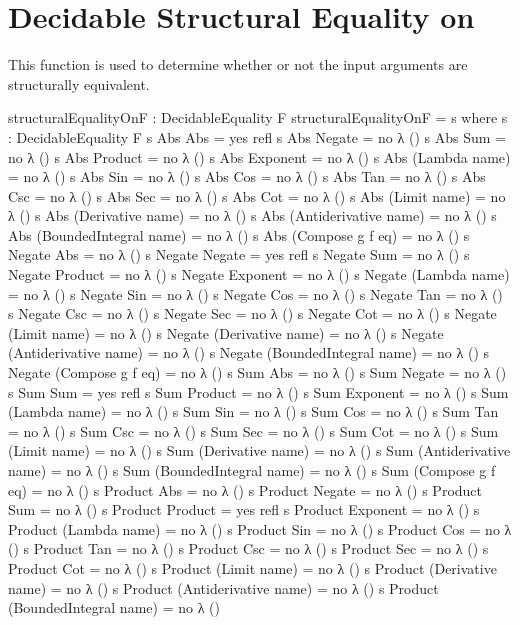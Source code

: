 \documentclass{report}
\begin{document}
\section{Decidable Structural Equality on }
This function is used to determine whether or not the input arguments are structurally equivalent.

\begin{code}
  structuralEqualityOnF : DecidableEquality F
  structuralEqualityOnF = s
    where
    s : DecidableEquality F
    s Abs Abs = yes refl
    s Abs Negate = no λ ()
    s Abs Sum = no λ ()
    s Abs Product = no λ ()
    s Abs Exponent = no λ ()
    s Abs (Lambda name) = no λ ()
    s Abs Sin = no λ ()
    s Abs Cos = no λ ()
    s Abs Tan = no λ ()
    s Abs Csc = no λ ()
    s Abs Sec = no λ ()
    s Abs Cot = no λ ()
    s Abs (Limit name) = no λ ()
    s Abs (Derivative name) = no λ ()
    s Abs (Antiderivative name) = no λ ()
    s Abs (BoundedIntegral name) = no λ ()
    s Abs (Compose g f eq) = no λ ()
    s Negate Abs = no λ ()
    s Negate Negate = yes refl
    s Negate Sum = no λ ()
    s Negate Product = no λ ()
    s Negate Exponent = no λ ()
    s Negate (Lambda name) = no λ ()
    s Negate Sin = no λ ()
    s Negate Cos = no λ ()
    s Negate Tan = no λ ()
    s Negate Csc = no λ ()
    s Negate Sec = no λ ()
    s Negate Cot = no λ ()
    s Negate (Limit name) = no λ ()
    s Negate (Derivative name) = no λ ()
    s Negate (Antiderivative name) = no λ ()
    s Negate (BoundedIntegral name) = no λ ()
    s Negate (Compose g f eq) = no λ ()
    s Sum Abs = no λ ()
    s Sum Negate = no λ ()
    s Sum Sum = yes refl
    s Sum Product = no λ ()
    s Sum Exponent = no λ ()
    s Sum (Lambda name) = no λ ()
    s Sum Sin = no λ ()
    s Sum Cos = no λ ()
    s Sum Tan = no λ ()
    s Sum Csc = no λ ()
    s Sum Sec = no λ ()
    s Sum Cot = no λ ()
    s Sum (Limit name) = no λ ()
    s Sum (Derivative name) = no λ ()
    s Sum (Antiderivative name) = no λ ()
    s Sum (BoundedIntegral name) = no λ ()
    s Sum (Compose g f eq) = no λ ()
    s Product Abs = no λ ()
    s Product Negate = no λ ()
    s Product Sum = no λ ()
    s Product Product = yes refl
    s Product Exponent = no λ ()
    s Product (Lambda name) = no λ ()
    s Product Sin = no λ ()
    s Product Cos = no λ ()
    s Product Tan = no λ ()
    s Product Csc = no λ ()
    s Product Sec = no λ ()
    s Product Cot = no λ ()
    s Product (Limit name) = no λ ()
    s Product (Derivative name) = no λ ()
    s Product (Antiderivative name) = no λ ()
    s Product (BoundedIntegral name) = no λ ()

\end{code}
\end{document}
